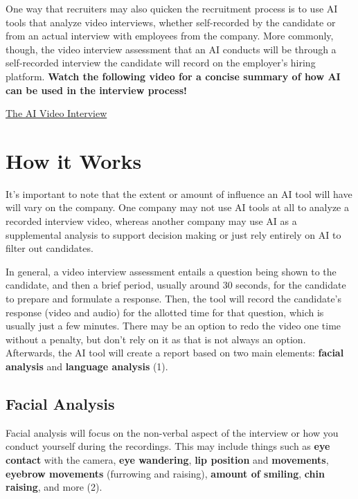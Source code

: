 \documentclass[
]{book}
\begin{document}
One way that recruiters may also quicken the recruitment process is to use AI tools that analyze video interviews, whether self-recorded by the candidate or from an actual interview with employees from the company. More commonly, though, the video interview assessment that an AI conducts will be through a self-recorded interview the candidate will record on the employer's hiring platform. \textbf{Watch the following video for a concise summary of how AI can be used in the interview process!}

\href{https://www.youtube.com/watch?v=cJkHft032OE}{The AI Video Interview}

\hypertarget{how-it-works}{%
\section{How it Works}\label{how-it-works}}

It's important to note that the extent or amount of influence an AI tool will have will vary on the company. One company may not use AI tools at all to analyze a recorded interview video, whereas another company may use AI as a supplemental analysis to support decision making or just rely entirely on AI to filter out candidates.

In general, a video interview assessment entails a question being shown to the candidate, and then a brief period, usually around 30 seconds, for the candidate to prepare and formulate a response. Then, the tool will record the candidate's response (video and audio) for the allotted time for that question, which is usually just a few minutes. There may be an option to redo the video one time without a penalty, but don't rely on it as that is not always an option. Afterwards, the AI tool will create a report based on two main elements: \textbf{facial analysis} and \textbf{language analysis} (1).~

\hypertarget{facial-analysis}{%
\subsection{Facial Analysis}\label{facial-analysis}}

Facial analysis will focus on the non-verbal aspect of the interview or how you conduct yourself during the recordings. This may include things such as \textbf{eye contact} with the camera, \textbf{eye wandering}, \textbf{lip position} and \textbf{movements}, \textbf{eyebrow movements} (furrowing and raising), \textbf{amount of smiling}, \textbf{chin raising}, and more (2).
\end{document}

